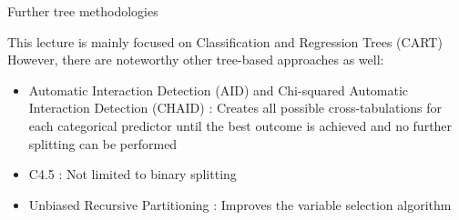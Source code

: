 \documentclass[11pt,compress,t,notes=noshow, xcolor=table]{beamer}
\begin{document}
\begin{frame2}{Further tree methodologies}

This lecture is mainly focused on Classification and Regression Trees (CART)  \\
However, there are noteworthy other tree-based approaches as well:

\begin{itemize}
\item Automatic Interaction Detection (AID)  and Chi-squared Automatic Interaction Detection (CHAID) : Creates all possible cross-tabulations for each categorical predictor until the best outcome is achieved and no further splitting can be performed
\item C4.5 : Not limited to binary splitting
\item Unbiased Recursive Partitioning : Improves the variable selection algorithm
\end{itemize}

\end{frame2}

\endlecture
\end{document}
